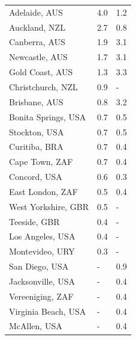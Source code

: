 \documentclass[Crown,sageh,times]{sagej}
\begin{document}
\begin{landscape}
\begin{table}[!htbp]
\begin{subtable}{.34\linewidth}
{\begin{tabular}{ l  l   l}
Adelaide, AUS&		4.0&		1.2\\
Auckland, NZL&		2.7	&0.8\\
Canberra, AUS&		1.9&		3.1\\
Newcastle, AUS	&	1.7&		3.1\\
Gold Coast, AUS&		1.3&	3.3\\
Christchurch, NZL&		0.9&		-\\
Brisbane, AUS&		0.8&	3.2\\
Bonita Springs, USA&		0.7&		0.5\\
Stockton, USA&		0.7&		0.5\\
Curitiba, BRA&		0.7&		0.4\\
Cape Town, ZAF&		0.7&		0.4\\
Concord, USA&		0.6&		0.3\\
East London, ZAF&		0.5&		0.4\\
West Yorkshire, GBR&		0.5&		-\\
Teeside, GBR&		0.4&		-\\
Los Angeles, USA&		0.4&		-\\
Montevideo, URY&		0.3&		-\\
San Diego, USA&		-&		0.9\\
Jacksonville, USA&	-&			0.4\\
Vereeniging, ZAF&	-&	0.4\\
Virginia Beach, USA&		-	&	0.4\\
McAllen, USA&	-	&	0.4\\
\end{tabular}
}
\end{subtable}%
\end{table}
\end{landscape}
\end{document}
